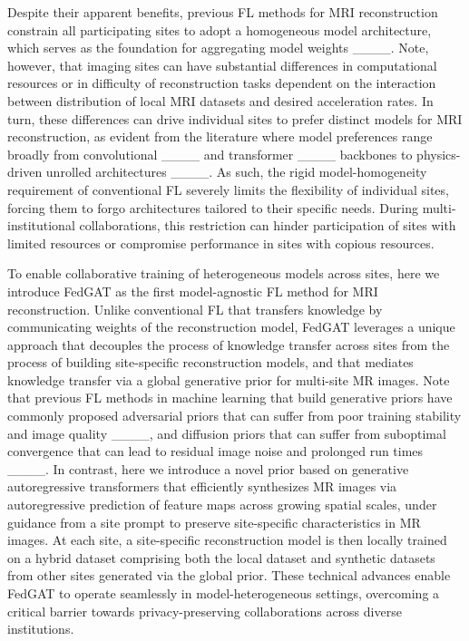 Despite their apparent benefits, previous FL methods for MRI reconstruction constrain all participating sites to adopt a homogeneous model architecture, which serves as the foundation for aggregating model weights ____. Note, however, that imaging sites can have substantial differences in computational resources or in difficulty of reconstruction tasks dependent on the interaction between distribution of local MRI datasets and desired acceleration rates. In turn, these differences can drive individual sites to prefer distinct models for MRI reconstruction, as evident from the literature where model preferences range broadly from convolutional ____ and transformer ____ backbones to physics-driven unrolled architectures ____. As such, the rigid model-homogeneity requirement of conventional FL severely limits the flexibility of individual sites, forcing them to forgo architectures tailored to their specific needs. During multi-institutional collaborations, this restriction can hinder participation of sites with limited resources or compromise performance in sites with copious resources.

To enable collaborative training of heterogeneous models across sites, here we introduce FedGAT as the first model-agnostic FL method for MRI reconstruction. Unlike conventional FL that transfers knowledge by communicating weights of the reconstruction model, FedGAT leverages a unique approach that decouples the process of knowledge transfer across sites from the process of building site-specific reconstruction models, and that mediates knowledge transfer via a global generative prior for multi-site MR images. Note that previous FL methods in machine learning that build generative priors have commonly proposed adversarial priors that can suffer from poor training stability and image quality ____, and diffusion priors that can suffer from suboptimal convergence that can lead to residual image noise and prolonged run times ____. In contrast, here we introduce a novel prior based on generative autoregressive transformers that efficiently synthesizes MR images via autoregressive prediction of feature maps across growing spatial scales, under guidance from a site prompt to preserve site-specific characteristics in MR images. At each site, a site-specific reconstruction model is then locally trained on a hybrid dataset comprising both the local dataset and synthetic datasets from other sites generated via the global prior. These technical advances enable FedGAT to operate seamlessly in model-heterogeneous settings, overcoming a critical barrier towards privacy-preserving collaborations across diverse institutions.